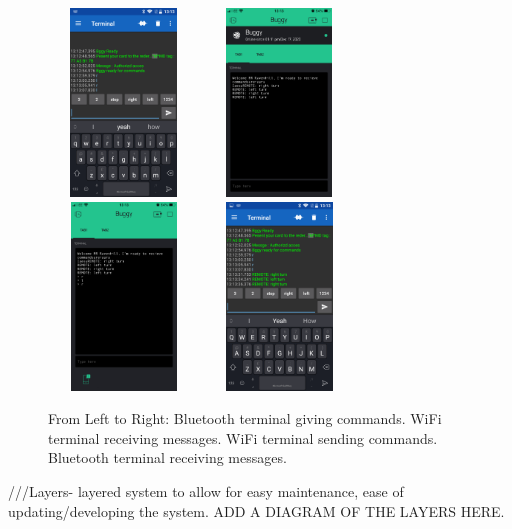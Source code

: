 \documentclass[8pt, a4paper]{article}
\begin{document}
\begin{figure}[H]
	\centering
	\includegraphics[height=5.0cm, width=4.0cm]{BLE_term}
	\includegraphics[height=5.0cm, width=4.0cm]{blynk_term2}
	\includegraphics[height=5.0cm, width=4.0cm]{blynk_term}
	\includegraphics[height=5.0cm, width=4.0cm]{BLE_term2}
	\caption{From Left to Right: Bluetooth terminal giving commands. WiFi terminal receiving messages. WiFi terminal sending commands. Bluetooth terminal receiving messages.}			
\end{figure}

///Layers- layered system to allow for easy maintenance, ease of updating/developing the system. ADD A DIAGRAM OF THE LAYERS HERE. 
\end{document}
